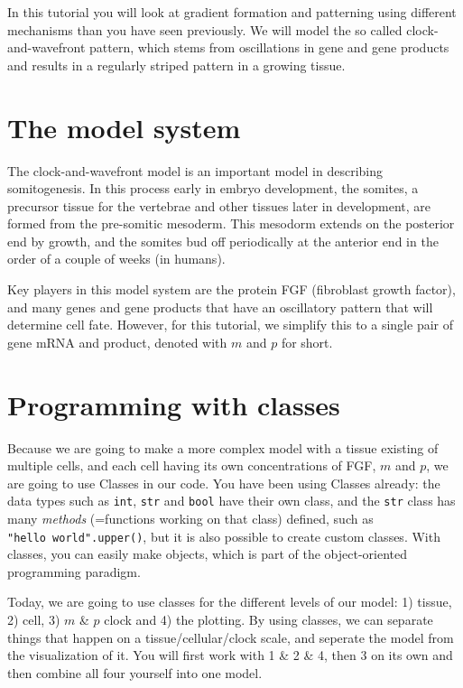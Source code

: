 \documentclass[
  letterpaper,
  DIV=11,
  numbers=noendperiod]{scrreprt}
\theoremstyle{definition}
\theoremstyle{remark}
\begin{document}
In this tutorial you will look at gradient formation and patterning
using different mechanisms than you have seen previously. We will model
the so called clock-and-wavefront pattern, which stems from oscillations
in gene and gene products and results in a regularly striped pattern in
a growing tissue.

\section{The model system}\label{the-model-system}

The clock-and-wavefront model is an important model in describing
somitogenesis. In this process early in embryo development, the somites,
a precursor tissue for the vertebrae and other tissues later in
development, are formed from the pre-somitic mesoderm. This mesodorm
extends on the posterior end by growth, and the somites bud off
periodically at the anterior end in the order of a couple of weeks (in
humans).

Key players in this model system are the protein FGF (fibroblast growth
factor), and many genes and gene products that have an oscillatory
pattern that will determine cell fate. However, for this tutorial, we
simplify this to a single pair of gene mRNA and product, denoted with
\(m\) and \(p\) for short.

\section{Programming with classes}\label{programming-with-classes}

Because we are going to make a more complex model with a tissue existing
of multiple cells, and each cell having its own concentrations of FGF,
\(m\) and \(p\), we are going to use Classes in our code. You have been
using Classes already: the data types such as \texttt{int}, \texttt{str}
and \texttt{bool} have their own class, and the \texttt{str} class has
many \emph{methods} (=functions working on that class) defined, such as
\texttt{"hello\ world".upper()}, but it is also possible to create
custom classes. With classes, you can easily make objects, which is part
of the object-oriented programming paradigm.

Today, we are going to use classes for the different levels of our
model: 1) tissue, 2) cell, 3) \(m\) \& \(p\) clock and 4) the plotting.
By using classes, we can separate things that happen on a
tissue/cellular/clock scale, and seperate the model from the
visualization of it. You will first work with 1 \& 2 \& 4, then 3 on its
own and then combine all four yourself into one model.
\end{document}
